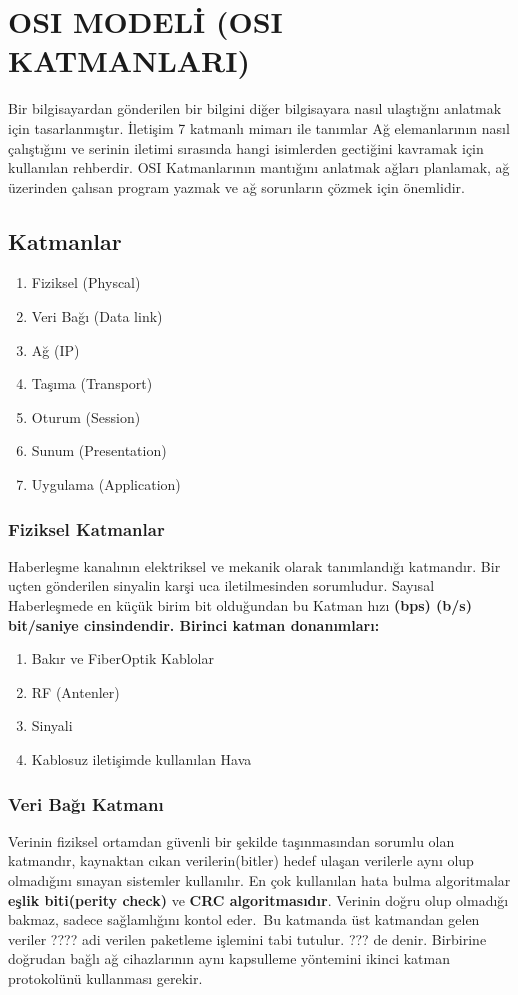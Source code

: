 \section{OSI MODELİ (OSI KATMANLARI)}
Bir bilgisayardan gönderilen bir bilgini diğer bilgisayara nasıl ulaştığnı anlatmak için tasarlanmıştır.
İletişim 7 katmanlı mimarı ile tanımlar Ağ elemanlarının nasıl çalıştığını ve serinin iletimi sırasında hangi isimlerden gectiğini kavramak için kullanılan rehberdir.
OSI Katmanlarının mantığını anlatmak ağları planlamak, ağ üzerinden çalısan program yazmak ve ağ sorunların çözmek için önemlidir.
\subsection{Katmanlar}
\begin{enumerate}
	\item Fiziksel (Physcal)
	\item Veri Bağı (Data link)
	\item Ağ (IP)
	\item Taşıma (Transport)
	\item Oturum (Session)
	\item Sunum (Presentation)
	\item Uygulama (Application)
\end{enumerate}

\subsubsection{Fiziksel Katmanlar}
Haberleşme kanalının elektriksel ve mekanik olarak tanımlandığı katmandır. Bir uçten gönderilen sinyalin karşi uca iletilmesinden sorumludur. Sayısal Haberleşmede en küçük birim bit olduğundan bu Katman hızı \bf{(bps) (b/s) bit/saniye} cinsindendir.
Birinci katman donanımları:
\begin{enumerate}
	\item Bakır ve FiberOptik Kablolar
	\item RF (Antenler)
	\item Sinyali
	\item Kablosuz iletişimde kullanılan Hava
\end{enumerate}

\subsubsection{Veri Bağı Katmanı}
Verinin fiziksel ortamdan güvenli bir şekilde taşınmasından sorumlu olan katmandır, kaynaktan cıkan verilerin(bitler) hedef ulaşan verilerle aynı olup olmadığını sınayan sistemler kullanılır.
En çok kullanılan hata bulma algoritmalar \textbf{eşlik biti(perity check)} ve \textbf{CRC algoritmasıdır}. Verinin doğru olup olmadığı bakmaz, sadece sağlamlığını kontol eder.\
Bu katmanda üst katmandan gelen veriler ???? adi verilen paketleme işlemini tabi tutulur. ??? de denir. Birbirine doğrudan bağlı ağ cihazlarının aynı kapsulleme yöntemini ikinci katman protokolünü kullanması gerekir.

